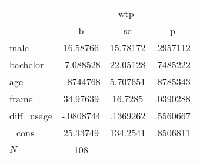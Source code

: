 {
\def\sym#1{\ifmmode^{#1}\else\(^{#1}\)\fi}
\begin{tabular}{l*{1}{ccc}}
\hline\hline
            &\multicolumn{3}{c}{wtp}               \\
            &           b&          se&           p\\
\hline
male        &    16.58766&    15.78172&    .2957112\\
bachelor    &   -7.088528&    22.05128&    .7485222\\
age         &   -.8744768&    5.707651&    .8785343\\
frame       &    34.97639&     16.7285&    .0390288\\
diff\_usage  &   -.0808744&    .1369262&    .5560667\\
\_cons      &    25.33749&    134.2541&    .8506811\\
\hline
\(N\)       &         108&            &            \\
\hline\hline
\end{tabular}
}
